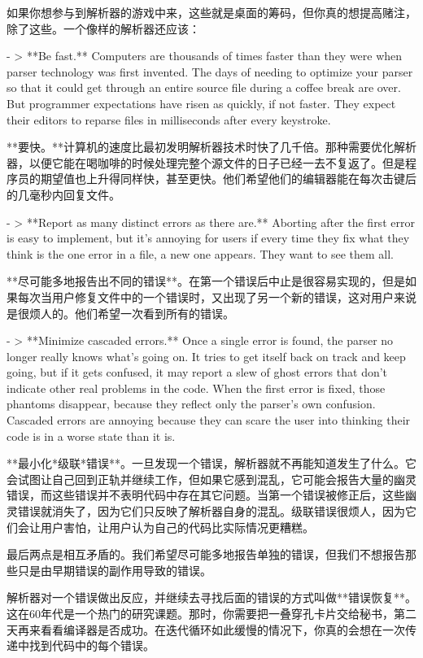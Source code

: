 \documentclass[cn,11pt,chinese]{elegantbook}
\begin{document}
如果你想参与到解析器的游戏中来，这些就是桌面的筹码，但你真的想提高赌注，除了这些。一个像样的解析器还应该：

- > **Be fast.** Computers are thousands of times faster than they were when parser technology was first invented. The days of needing to optimize your parser so that it could get through an entire source file during a coffee break are over. But programmer expectations have risen as quickly, if not faster. They expect their editors to reparse files in milliseconds after every keystroke.

  **要快。**计算机的速度比最初发明解析器技术时快了几千倍。那种需要优化解析器，以便它能在喝咖啡的时候处理完整个源文件的日子已经一去不复返了。但是程序员的期望值也上升得同样快，甚至更快。他们希望他们的编辑器能在每次击键后的几毫秒内回复文件。

- > **Report as many distinct errors as there are.** Aborting after the first error is easy to implement, but it’s annoying for users if every time they fix what they think is the one error in a file, a new one appears. They want to see them all.

  **尽可能多地报告出不同的错误**。在第一个错误后中止是很容易实现的，但是如果每次当用户修复文件中的一个错误时，又出现了另一个新的错误，这对用户来说是很烦人的。他们希望一次看到所有的错误。

- > **Minimize \*cascaded\* errors.** Once a single error is found, the parser no longer really knows what’s going on. It tries to get itself back on track and keep going, but if it gets confused, it may report a slew of ghost errors that don’t indicate other real problems in the code. When the first error is fixed, those phantoms disappear, because they reflect only the parser’s own confusion. Cascaded errors are annoying because they can scare the user into thinking their code is in a worse state than it is.

  **最小化*级联*错误**。一旦发现一个错误，解析器就不再能知道发生了什么。它会试图让自己回到正轨并继续工作，但如果它感到混乱，它可能会报告大量的幽灵错误，而这些错误并不表明代码中存在其它问题。当第一个错误被修正后，这些幽灵错误就消失了，因为它们只反映了解析器自身的混乱。级联错误很烦人，因为它们会让用户害怕，让用户认为自己的代码比实际情况更糟糕。

最后两点是相互矛盾的。我们希望尽可能多地报告单独的错误，但我们不想报告那些只是由早期错误的副作用导致的错误。

解析器对一个错误做出反应，并继续去寻找后面的错误的方式叫做**错误恢复**。这在60年代是一个热门的研究课题。那时，你需要把一叠穿孔卡片交给秘书，第二天再来看看编译器是否成功。在迭代循环如此缓慢的情况下，你真的会想在一次传递中找到代码中的每个错误。
\end{document}
